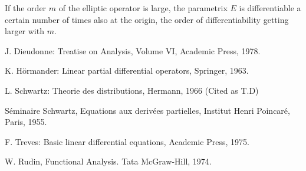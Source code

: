 \begin{remark*}
If the order $m$ of the elliptic operator is large, the parametrix $E$ is differentiable a certain number of times also at the origin, the order of differentiability getting larger with $m$.
\end{remark*}



\begin{thebibliography}{99}\pageoriginale
{} J. Dieudonne: Treatise on Analysis, Volume VI, Academic Press, 1978.


 K. H\"ormander: Linear partial differential operators, Springer, 1963.

 L. Schwartz: Theorie des distributions, Hermann, 1966 (Cited as T.D)

 S\'eminaire Schwartz, Equations aux deriv\'ees partielles, Institut Henri Poincar\'e, Paris, 1955.

 F. Treves: Basic linear differential equations, Academic Press, 1975.

 W. Rudin, Functional Analysis. Tata McGraw-Hill, 1974.
\end{thebibliography}
